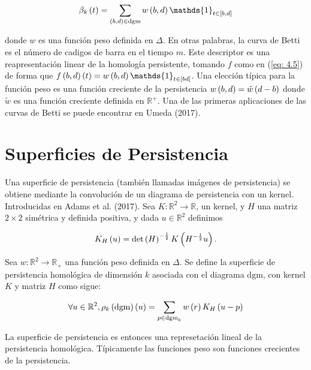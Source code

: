 \begin{equation*}
    \beta_{k}\cpar{t}=\sum_{\cpar{b,d}\in\mathrm{dgm}}w\cpar{b,d}\mathds{1}_{t\in\ccorch{b,d}}
\end{equation*}

\noindent donde $w$ es una funci\'on peso definida en $\Delta$. En otras palabras,
la curva de Betti es el n\'umero de cadigos de barra en el tiempo $m$.
Este descriptor es una reapresentaci\'on linear de la homolog\'ia persistente,
tomando $f$ como en (\ref{eq: 4.5}) de forma que
$f\cpar{b,d}\cpar{t}=w\cpar{b,d}\mathds{1}_{t\in\ccorch{bd}}$.
Una elecci\'on t\'ipica para la funci\'on peso es una funci\'on creciente de la persistencia
$w\left(b,d\right)=\tilde{w}\left(d-b\right)$ donde $\tilde{w}$ es una funci\'on creciente definida en $\mathbb{R}^{+}$.
Una de las primeras aplicaciones de las curvas de Betti se puede encontrar en Umeda (2017)\cite{Umeda2017}.

\section*{Superficies de Persistencia}

Una superficie de persistencia (tambi\'en llamadas im\'agenes de persistencia)
se obtiene mediante la convoluci\'on de un diagrama de persistencia con un kernel.
Introducidas en Adams et al. (2017)\cite{Adams2017}. Sea $K:\mathbb{R}^{2}\rightarrow\mathbb{R}$,
un kernel, y $H$ una matriz $2\times 2$ sim\'etrica y definida positiva,
y dada $u\in\mathbb{R}^{2}$ definimos

\begin{equation*}
    K_{H}\left(u\right)=\det\left(H\right)^{-\frac{1}{2}}K\left(H^{-\frac{1}{2}}u\right).
\end{equation*}

Sea $w:\mathbb{R}^{2}\rightarrow\mathbb{R}_{+}$ una funci\'on peso definida en $\Delta$.
Se define la superficie de persistencia homol\'ogica de dimensi\'on $k$ asociada con el diagrama $\mathrm{dgm}$,
con kernel $K$ y matriz $H$ como sigue:

\begin{equation*}
    \forall u\in\mathbb{R}^{2},
    \rho_{k}\left(\mathrm{dgm}\right)\left(u\right)=
    \sum_{p\in\mathrm{dgm}_{k}}w\left(r\right)K_{H}\left(u-p\right)
\end{equation*}

La superficie de persistencia es entonces una represetaci\'on lineal de la persistencia homol\'ogica.
T\'ipicamente las funciones peso son funciones crecientes de la persistencia.

